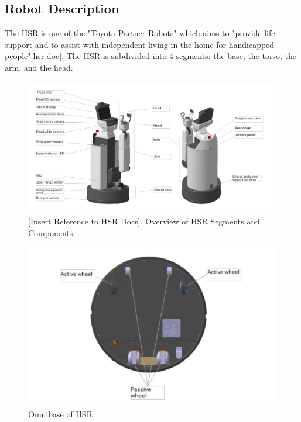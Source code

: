 \documentclass[12pt]{article}
\begin{document}
    \subsection{Robot Description}
        The HSR is one of the "Toyota Partner Robots" which aims to "provide life support and to assist with independent living in the home for handicapped people"[hsr doc]. The HSR is subdivided into 4 segments: the base, the torso, the arm, and the head. 
        \begin{figure}[ht]
            \includegraphics[width=\linewidth]{2020.05.07/hsr_overview.png}
            \centering
            \caption{[Insert Reference to HSR Docs]. Overview of HSR Segments and Components.}
            \label{fig:hsrOverview}
        \end{figure}

        \begin{figure}[ht]
            \includegraphics[width=0.60\linewidth]{2020.05.07/hsr_base.png}
            \centering
            \caption{Omnibase of HSR}
            \label{fig:hsrBase}
        \end{figure}
\end{document}
